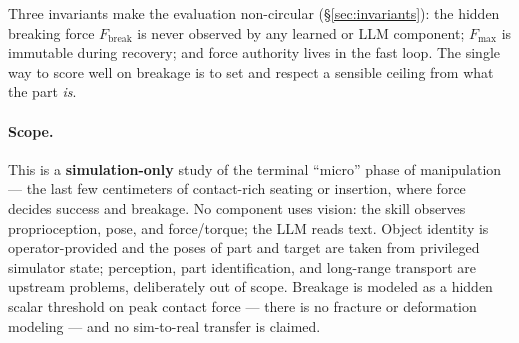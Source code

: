 \documentclass[11pt]{article}
\newcommand{\Fmax}{\ensuremath{F_{\max}}}
\newcommand{\Fbreak}{\ensuremath{F_{\mathrm{break}}}}
\begin{document}
Three invariants make the evaluation non-circular (\S\ref{sec:invariants}): the hidden breaking force \Fbreak{} is never observed by any learned or LLM component; \Fmax{} is immutable during recovery; and force authority lives in the fast loop. The single way to score well on breakage is to set and respect a sensible ceiling from what the part \emph{is}.

\paragraph{Scope.} This is a \textbf{simulation-only} study of the terminal ``micro'' phase of manipulation --- the last few centimeters of contact-rich seating or insertion, where force decides success and breakage. No component uses vision: the skill observes proprioception, pose, and force/torque; the LLM reads text. Object identity is operator-provided and the poses of part and target are taken from privileged simulator state; perception, part identification, and long-range transport are upstream problems, deliberately out of scope. Breakage is modeled as a hidden scalar threshold on peak contact force --- there is no fracture or deformation modeling --- and no sim-to-real transfer is claimed.
\end{document}
